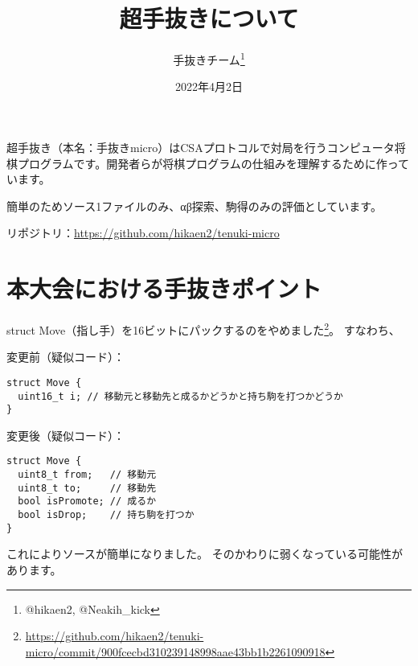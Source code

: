 \documentclass[11pt,a4paper]{ltjsarticle}
\title{超手抜きについて}
\author{手抜きチーム\thanks{@hikaen2, @Neakih\_kick}}
\date{2022年4月2日}
\begin{document}
\maketitle

超手抜き（本名：手抜きmicro）はCSAプロトコルで対局を行うコンピュータ将棋プログラムです。開発者らが将棋プログラムの仕組みを理解するために作っています。

簡単のためソース1ファイルのみ、αβ探索、駒得のみの評価としています。

リポジトリ：\url{https://github.com/hikaen2/tenuki-micro}


\section*{本大会における手抜きポイント}


struct Move（指し手）を16ビットにパックするのをやめました\footnote{\url{https://github.com/hikaen2/tenuki-micro/commit/900fcecbd310239148998aae43bb1b2261090918}}。
すなわち、

\noindent 変更前（疑似コード）：

\begin{verbatim}
struct Move {
  uint16_t i; // 移動元と移動先と成るかどうかと持ち駒を打つかどうか
}
\end{verbatim}


\noindent 変更後（疑似コード）：

\begin{verbatim}
struct Move {
  uint8_t from;   // 移動元
  uint8_t to;     // 移動先
  bool isPromote; // 成るか
  bool isDrop;    // 持ち駒を打つか
}
\end{verbatim}

これによりソースが簡単になりました。
そのかわりに弱くなっている可能性があります。
\end{document}
